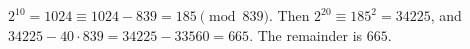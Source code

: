 $2^{10}=1024\equiv1024-839=185\pmod{839}$. Then $2^{20}\equiv185^2=34225$, and $34225-40\cdot839=34225-33560=665$. The remainder is $\boxed{665}$.
